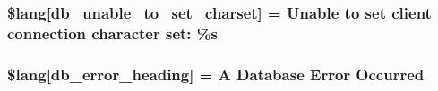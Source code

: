 \subsubsection[{\$lang}]{\setlength{\rightskip}{0pt plus 5cm}\$lang\mbox{[}\textquotesingle{}db\+\_\+unable\+\_\+to\+\_\+set\+\_\+charset\textquotesingle{}\mbox{]} = \textquotesingle{}Unable to set client connection character set\+: \%s\textquotesingle{}}\label{system_2language_2english_2db__lang_8php_ab22396948e25460833329cb8786ad831}
\hypertarget{system_2language_2english_2db__lang_8php_a4be34cea2490b0d41689b65e52286658}{}
\subsubsection[{\$lang}]{\setlength{\rightskip}{0pt plus 5cm}\$lang\mbox{[}\textquotesingle{}db\+\_\+error\+\_\+heading\textquotesingle{}\mbox{]} = \textquotesingle{}A Database Error Occurred\textquotesingle{}}\label{system_2language_2english_2db__lang_8php_a4be34cea2490b0d41689b65e52286658}
